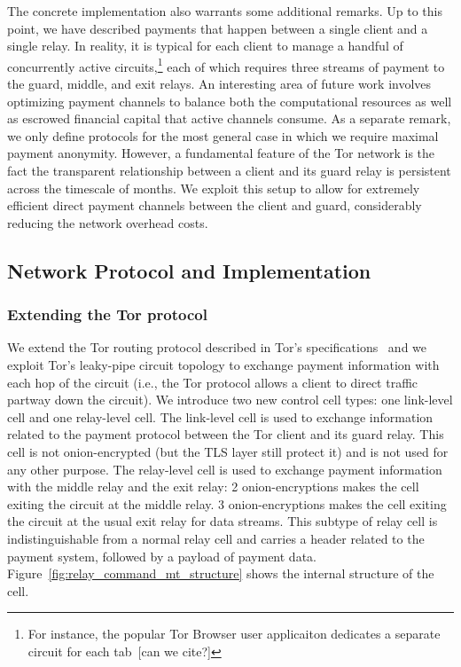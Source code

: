 The concrete implementation also warrants some additional remarks. Up to this
point, we have described payments that happen between a single client and a
single relay. In reality, it is typical for each client to manage a handful of
concurrently active circuits,\footnote{For instance, the popular Tor Browser
  user applicaiton dedicates a separate circuit for each tab~[can we cite?]}
each of which requires three streams of payment to the guard, middle, and exit
relays. An interesting area of future work involves optimizing payment channels
to balance both the computational resources as well as escrowed financial
capital that active channels consume. As a separate remark, we only define
protocols for the most general case in which we require maximal payment
anonymity. However, a fundamental feature of the Tor network is the fact the
transparent relationship between a client and its guard relay is persistent
across the timescale of months. We exploit this setup to allow for extremely
efficient direct payment channels between the client and guard, considerably
reducing the network overhead costs.

\subsection{Network Protocol and Implementation}

\subsubsection{Extending the Tor protocol}
We extend the Tor routing protocol described in Tor's specifications~\cite{torspec} and we exploit Tor's leaky-pipe circuit topology to exchange payment information with each hop of the circuit (i.e., the Tor protocol allows a client to direct traffic partway down the circuit). We introduce two new control cell types: one link-level cell and one relay-level cell. The link-level cell is used to exchange information related to the payment protocol between the Tor client and its guard relay. This cell is not onion-encrypted (but the TLS layer still protect it) and is not used for any other purpose. The relay-level cell is used to exchange payment information with the middle relay and the exit relay: 2 onion-encryptions makes the cell exiting the circuit at the middle relay. 3 onion-encryptions makes the cell exiting the circuit at the usual exit relay for data streams. This subtype of relay cell is indistinguishable from a normal relay cell and carries a header related to the payment system, followed by a payload of payment data. Figure~\ref{fig:relay_command_mt_structure} shows the internal structure of the cell.

